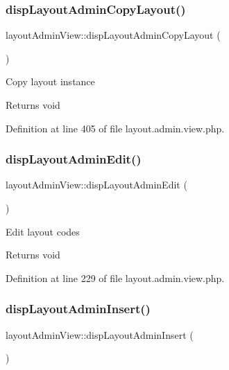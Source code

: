 \subsubsection{\texorpdfstring{disp\+Layout\+Admin\+Copy\+Layout()}{dispLayoutAdminCopyLayout()}}
{\footnotesize\ttfamily layout\+Admin\+View\+::disp\+Layout\+Admin\+Copy\+Layout (\begin{DoxyParamCaption}{ }\end{DoxyParamCaption})}

Copy layout instance \begin{DoxyReturn}{Returns}
void 
\end{DoxyReturn}


Definition at line 405 of file layout.\+admin.\+view.\+php.

\hypertarget{classlayoutAdminView_a21250397a3190ca81f64d8ad9af3fff8}{}\label{classlayoutAdminView_a21250397a3190ca81f64d8ad9af3fff8} 
\subsubsection{\texorpdfstring{disp\+Layout\+Admin\+Edit()}{dispLayoutAdminEdit()}}
{\footnotesize\ttfamily layout\+Admin\+View\+::disp\+Layout\+Admin\+Edit (\begin{DoxyParamCaption}{ }\end{DoxyParamCaption})}

Edit layout codes \begin{DoxyReturn}{Returns}
void 
\end{DoxyReturn}


Definition at line 229 of file layout.\+admin.\+view.\+php.

\hypertarget{classlayoutAdminView_a8b9a9218b2de78d6a0578471852310b0}{}\label{classlayoutAdminView_a8b9a9218b2de78d6a0578471852310b0} 
\subsubsection{\texorpdfstring{disp\+Layout\+Admin\+Insert()}{dispLayoutAdminInsert()}}
{\footnotesize\ttfamily layout\+Admin\+View\+::disp\+Layout\+Admin\+Insert (\begin{DoxyParamCaption}{ }\end{DoxyParamCaption})}

